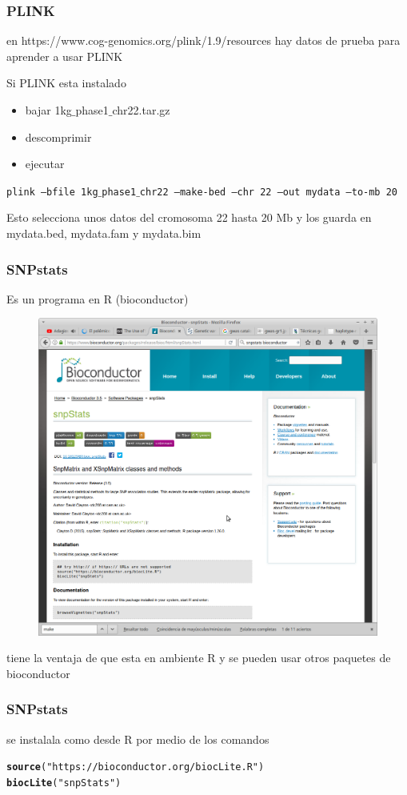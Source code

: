 \documentclass{beamer}\usepackage[]{graphicx}\usepackage[]{color}
\makeatletter
\newcommand{\hlstr}[1]{\textcolor[rgb]{0.192,0.494,0.8}{#1}}%
\newcommand{\hlstd}[1]{\textcolor[rgb]{0.345,0.345,0.345}{#1}}%
\newcommand{\hlkwd}[1]{\textcolor[rgb]{0.737,0.353,0.396}{\textbf{#1}}}%
\newenvironment{kframe}{%
 \def\at@end@of@kframe{}%
 \ifinner\ifhmode%
  \def\at@end@of@kframe{\end{minipage}}%
  \begin{minipage}{\columnwidth}%
 \fi\fi%
 \def\FrameCommand##1{\hskip\@totalleftmargin \hskip-\fboxsep
 \colorbox{shadecolor}{##1}\hskip-\fboxsep
     \hskip-\linewidth \hskip-\@totalleftmargin \hskip\columnwidth}%
 \MakeFramed {\advance\hsize-\width
   \@totalleftmargin\z@ \linewidth\hsize
   \@setminipage}}%
 {\par\unskip\endMakeFramed%
 \at@end@of@kframe}
\newenvironment{knitrout}{}{} %
\makeatother
\begin{document}
\begin{frame}[fragile]
\frametitle{PLINK}
en https://www.cog-genomics.org/plink/1.9/resources hay datos de prueba para aprender a usar PLINK

Si PLINK esta instalado
\begin{itemize}
\item bajar  1kg$\_$phase1$\_$chr22.tar.gz
\item descomprimir
\item ejecutar 
\end{itemize}

{\tt plink --bfile 1kg$\_$phase1$\_$chr22 --make-bed --chr 22 --out mydata --to-mb 20}

Esto selecciona unos datos del cromosoma 22 hasta 20 Mb y los guarda en mydata.bed, mydata.fam y mydata.bim
\end{frame}


\begin{frame}[fragile]
\frametitle{SNPstats}
Es un programa en R (bioconductor)

\begin{figure}[htbp]
\begin{center}
\includegraphics[width=.6\linewidth]{snpstats.png}
\end{center}
\end{figure}

tiene la ventaja de que esta en ambiente R y se pueden usar otros paquetes de bioconductor
\end{frame}



\begin{frame}[fragile]
\frametitle{SNPstats}

se instalala como desde R por medio de los comandos

\begin{knitrout}\footnotesize
{}\color{fgcolor}\begin{kframe}
\begin{alltt}
\hlkwd{source}\hlstd{(}\hlstr{"https://bioconductor.org/biocLite.R"}\hlstd{)}
\hlkwd{biocLite}\hlstd{(}\hlstr{"snpStats"}\hlstd{)}
\end{alltt}
\end{kframe}
\end{knitrout}
\end{frame}
\end{document}
